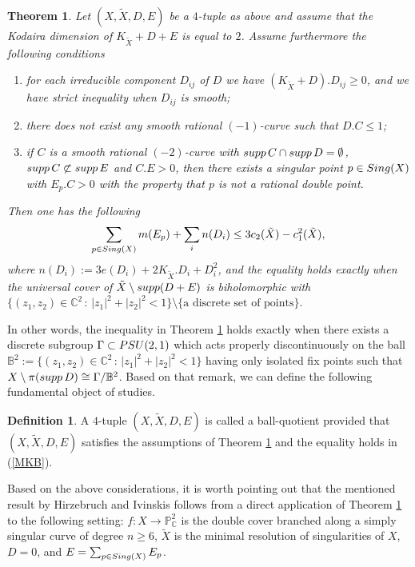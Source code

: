 \documentclass[11pt]{amsart}
\theoremstyle{plain}
\newtheorem{theorem}[thm]{Theorem}
\theoremstyle{definition}
\newtheorem{definition}[thm]{Definition}
\numberwithin{equation}{section}
\begin{document}
\begin{theorem} 
\label{ball-quotient}
Let $(X,\tilde{X},D,E)$ be a $4$-tuple  as above and assume that the Kodaira dimension of $K_{\tilde{X}}+D+E$ is equal to $2$. Assume furthermore the following conditions
\begin{enumerate}
\item[1)] for each irreducible component $D_{ij}$ of $D$ we have $(K_{\tilde{X}}+D).D_{ij}\geq 0$, and we have strict inequality when $D_{ij}$ is smooth;
\item[2)] there does not exist any smooth rational $(-1)$-curve such that $D.C\leq 1$;
\item[3)] if $C$ is a smooth rational $(-2)$-curve with ${\rm supp}\, C \cap {\rm supp}\, D = \emptyset$, ${\rm supp}\, C \not\subset {\rm supp}\, E$ and $C . E >0$, then there exists a singular point $p \in {\rm Sing}(X)$ with $E_{p}.C > 0$ with the property that $p$ is not a rational double point. 
\end{enumerate}
Then one has the following
\begin{equation}
\label{MKB}
\sum_{p \in {\rm Sing}(X)}m(E_{p}) + \sum_{i}n(D_{i}) \leq 3c_{2}(\tilde{X}) -c_{1}^{2}(\tilde{X}),
\end{equation}
where $n(D_{i}) :=3e(D_{i})+2K_{\tilde{X}}.D_{i}+D_{i}^{2}$, and the equality holds exactly when the universal cover of $\tilde{X} \setminus {\rm supp}(D+E)$ is biholomorphic with $\{(z_{1},z_{2})\in \mathbb{C}^{2} \,:\, |z_{1}|^{2}+|z_{2}|^{2}<1\} \setminus \{ \text{a discrete set of points}\}.$

\end{theorem}
In other words, the inequality in Theorem \ref{ball-quotient} holds exactly when there exists a discrete subgroup $\Gamma \subset {\rm PSU}(2,1)$ which acts properly discontinuously on the ball $\mathbb{B}^{2}:=\{(z_{1},z_{2})\in \mathbb{C}^{2} \,:\, |z_{1}|^{2}+|z_{2}|^{2}<1\}$ having only isolated fix points such that $X \setminus \pi({\rm supp}\, D) \cong \Gamma / \mathbb{B}^{2}$. Based on that remark, we can define the following fundamental object of studies.
\begin{definition}
A $4$-tuple $(X, \tilde{X}, D,E)$ is called a ball-quotient provided that $(X,\tilde{X},D,E)$ satisfies the assumptions of Theorem \ref{ball-quotient} and the equality holds in (\ref{MKB}).
\end{definition}

Based on the above considerations, it is worth pointing out that the mentioned result by Hirzebruch and Ivinskis follows from a direct application of Theorem \ref{ball-quotient} to the following setting: $f: X \rightarrow \mathbb{P}^{2}_{\mathbb{C}}$ is the double cover branched along a simply singular curve of degree $n\geq 6$, $\tilde{X}$ is the minimal resolution of singularities of $X$, $D=0$, and $E = \sum_{p \in {\rm Sing}(X)}E_{p}$. 
\end{document}
